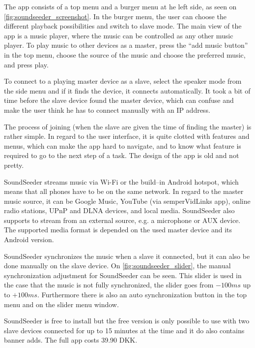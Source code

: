 The app consists of a top menu and a burger menu at he left side, as seen on \cref{fig:soundseeder_screenshot}.
In the burger menu, the user can choose the different playback possibilities and switch to slave mode.
The main view of the app is a music player, where the music can be controlled as any other music player. 
To play music to other devices as a master, press the ``add music button'' in the top menu,
choose the source of the music and choose the preferred music, and press play. 

To connect to a playing master device as a slave, select the speaker mode from the side menu and if it finds the device, it connects automatically.
It took a bit of time before the slave device found the master device, which can confuse and make the user think he has to connect manually with an IP address. 

The process of joining (when the slave are given the time of finding the master) is rather simple.
In regard to the user interface, it is quite clotted with features and menus, which can make the app hard to navigate,
and to know what feature is required to go to the next step of a task.
The design of the app is old and not pretty.

SoundSeeder streams music via Wi-Fi or the build--in Android hotspot, 
which means that all phones have to be on the same network\cite{soundseether_faq}.
In regard to the master music source, it can be Google Music, YouTube (via semperVidLinks app), online radio stations, UPnP and DLNA devices, and local media.
SoundSeeder also supports to stream from an external source, e.g. a microphone or AUX device. 
The supported media format is depended on the used master device and its Android version.\cite{soundseether_faq}

SoundSeeder synchronizes the music when a slave it connected, but it can also be done manually on the slave device. 
On \cref{fig:soundseeder_slider}, the manual synchronization adjustment for SoundSeeder can be seen.
This slider is used in the case that the music is not fully synchronized, the slider goes from $-100 ms$ up to $+100 ms$.
Furthermore there is also an auto synchronization button in the top menu and on the slider menu window. 

SoundSeeder is free to install but the free version is only possible to use with two slave devices connected for up to 15 minutes at the time and it do also contains banner adds.
The full app costs 39.90 DKK. 

